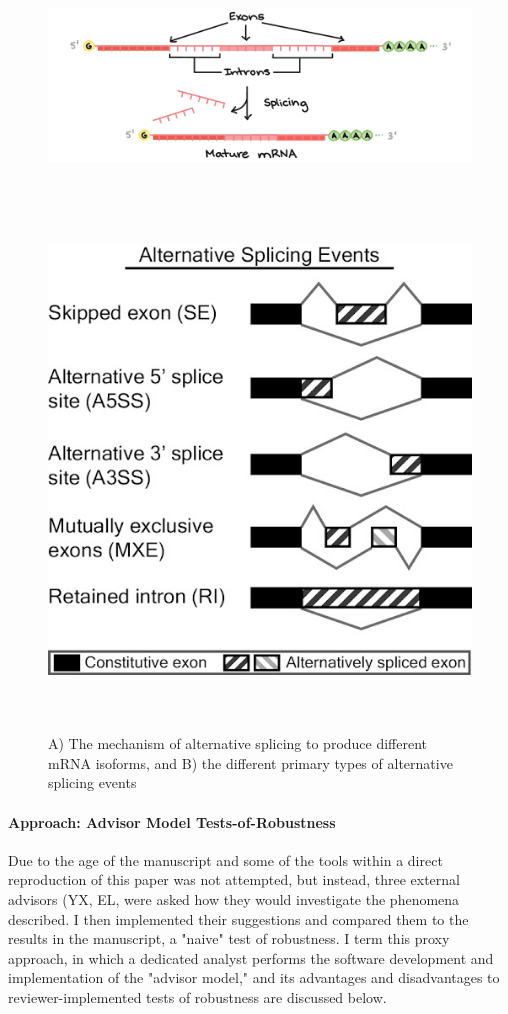 \documentclass{drexelthesis}
\begin{document}
\begin{figure}[h!]
	\centering
	\includegraphics[width=16.51cm,height=6.03cm]{./images/splicemech.png}
	\includegraphics[width=13.31cm,height=13.55cm]{./images/splicetype.png}
	\caption{A) The mechanism of alternative splicing to produce different mRNA isoforms, and B) the different primary types of alternative splicing events}
	\label{splice}
\end{figure}

\paragraph{Approach: Advisor Model Tests-of-Robustness}

Due to the age of the manuscript and some of the tools within a direct reproduction of this paper was not attempted, but instead, three external advisors (YX, EL, were asked how they would investigate the phenomena described. I then implemented their suggestions and compared them to the results in the manuscript, a "naive" test of robustness. I term this proxy approach, in which a dedicated analyst performs the software development and implementation of the "advisor model," and its advantages and disadvantages to reviewer-implemented tests of robustness are discussed below.
\end{document}
